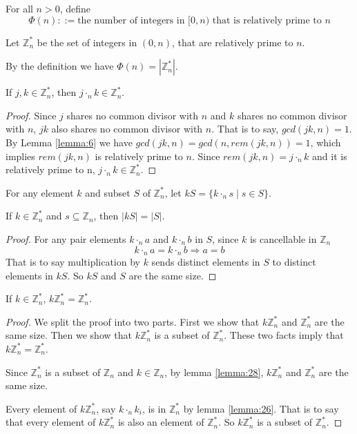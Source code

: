\documentclass[11pt]{article}
\newcommand{\Zn}{\mathbb{Z}_n}
\newcommand{\Zns}{\mathbb{Z}^\ast_n}
\newcommand{\Dotn}{\cdot_n}
\begin{document}
\begin{definition}
For all $n > 0$, define
\[
  \Phi(n) ::= \text{the number of integers in } [0, n) \text{ that is relatively prime to }
  n
\]
\end{definition}

\begin{definition}
Let $\Zns$ be the set of integers in $(0,n)$, that are relatively prime to $n$.
\end{definition}

By the definition we have $\Phi(n) = |\Zns|$.

\begin{lemma}
If $j,k \in \Zns$, then $j \cdot_n k \in \Zns$.
\end{lemma}

\begin{proof}
Since $j$ shares no common divisor with $n$ and $k$ shares no common divisor with $n$, $jk$
also shares no common divisor with $n$. That is to say, $gcd(jk,n)=1$. By Lemma
\ref{lemma:6} we have $gcd(jk,n) = gcd(n,rem(jk,n))=1$, which implies $rem(jk,n)$ is
relatively prime to $n$. Since $rem(jk,n) = j \cdot_n k$ and it is relatively prime to n,
$j \cdot_n k \in \Zns$.
\end{proof}

\begin{definition}
For any element $k$ and subset $S$ of $\Zns$, let $kS = \{k \cdot_n s \mid s \in S\}$.
\end{definition}

\begin{lemma} \label{lemma:26}
If $k \in \Zns$ and $s \subseteq \Zn$, then $|kS| = |S|$.
\end{lemma}

\begin{proof}
For any pair elements $k \Dotn a$ and $k \Dotn b$ in $S$, since $k$ is cancellable in $\Zn$
\[
  k \Dotn a = k \Dotn b \Rightarrow a = b
\]
That is to say multiplication by $k$ sends distinct elements in $S$ to distinct elements in
$kS$. So $kS$ and $S$ are the same size.
\end{proof}

\begin{lemma} \label{lemma:28}
If $k \in \Zns$, $k\Zns = \Zns$.
\end{lemma}

\begin{proof}
We split the proof into two parts. First we show that $k\Zns$ and $\Zns$ are the same size.
Then we show that $k\Zns$ is a subset of $\Zns$. These two facts imply that $k\Zns = \Zns$.

Since $\Zns$ is a subset of $\Zn$ and $k \in \Zn$, by lemma \ref{lemma:28}, $k\Zns$ and
$\Zns$ are the same size.

Every element of $k\Zns$, say $k \Dotn k_i$, is in $\Zns$ by lemma \ref{lemma:26}. That is
to say that every element of $k\Zns$ is also an element of $\Zns$. So $k\Zns$ is a subset of
$\Zns$.
\end{proof}
\end{document}

